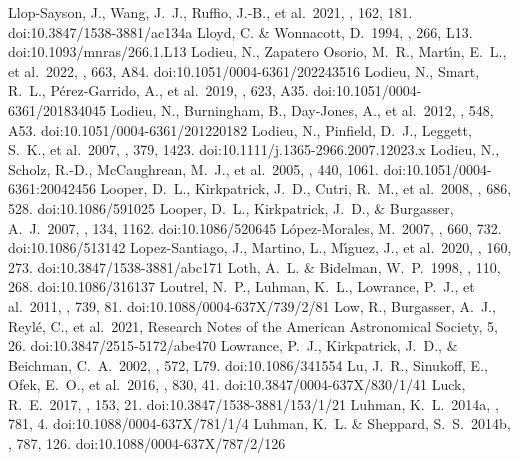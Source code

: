 \documentclass[twocolumn,tighten,twocolappendix]{aastex631}
\begin{document}
\begin{thebibliography}{}
 Llop-Sayson, J., Wang, J.~J., Ruffio, J.-B., et al.\ 2021, \aj, 162, 181. doi:10.3847/1538-3881/ac134a
 Lloyd, C. \& Wonnacott, D.\ 1994, \mnras, 266, L13. doi:10.1093/mnras/266.1.L13
 Lodieu, N., Zapatero Osorio, M.~R., Mart{\'\i}n, E.~L., et al.\ 2022, \aap, 663, A84. doi:10.1051/0004-6361/202243516
 Lodieu, N., Smart, R.~L., P{\'e}rez-Garrido, A., et al.\ 2019, \aap, 623, A35. doi:10.1051/0004-6361/201834045
 Lodieu, N., Burningham, B., Day-Jones, A., et al.\ 2012, \aap, 548, A53. doi:10.1051/0004-6361/201220182
 Lodieu, N., Pinfield, D.~J., Leggett, S.~K., et al.\ 2007, \mnras, 379, 1423. doi:10.1111/j.1365-2966.2007.12023.x
 Lodieu, N., Scholz, R.-D., McCaughrean, M.~J., et al.\ 2005, \aap, 440, 1061. doi:10.1051/0004-6361:20042456
 Looper, D.~L., Kirkpatrick, J.~D., Cutri, R.~M., et al.\ 2008, \apj, 686, 528. doi:10.1086/591025
 Looper, D.~L., Kirkpatrick, J.~D., \& Burgasser, A.~J.\ 2007, \aj, 134, 1162. doi:10.1086/520645
 L{\'o}pez-Morales, M.\ 2007, \apj, 660, 732. doi:10.1086/513142
 Lopez-Santiago, J., Martino, L., M{\'\i}guez, J., et al.\ 2020, \aj, 160, 273. doi:10.3847/1538-3881/abc171
 Loth, A.~L. \& Bidelman, W.~P.\ 1998, \pasp, 110, 268. doi:10.1086/316137
 Loutrel, N.~P., Luhman, K.~L., Lowrance, P.~J., et al.\ 2011, \apj, 739, 81. doi:10.1088/0004-637X/739/2/81
 Low, R., Burgasser, A.~J., Reyl{\'e}, C., et al.\ 2021, Research Notes of the American Astronomical Society, 5, 26. doi:10.3847/2515-5172/abe470
 Lowrance, P.~J., Kirkpatrick, J.~D., \& Beichman, C.~A.\ 2002, \apjl, 572, L79. doi:10.1086/341554
 Lu, J.~R., Sinukoff, E., Ofek, E.~O., et al.\ 2016, \apj, 830, 41. doi:10.3847/0004-637X/830/1/41
 Luck, R.~E.\ 2017, \aj, 153, 21. doi:10.3847/1538-3881/153/1/21
 Luhman, K.~L.\ 2014a, \apj, 781, 4. doi:10.1088/0004-637X/781/1/4
 Luhman, K.~L. \& Sheppard, S.~S.\ 2014b, \apj, 787, 126. doi:10.1088/0004-637X/787/2/126

\end{thebibliography}
\end{document}
